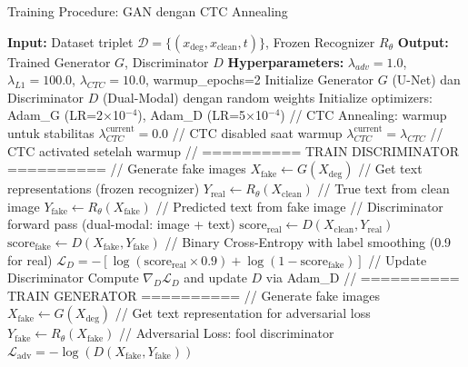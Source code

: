 \documentclass[12pt,a4paper]{article}
\begin{document}
\begin{algorithm}[H]
\caption{Training Procedure: GAN dengan CTC Annealing}
\label{alg:gan-training}
\scriptsize
\begin{algorithmic}[1]
\STATE \textbf{Input:} Dataset triplet $\mathcal{D} = \{(x_{\text{deg}}, x_{\text{clean}}, t)\}$, Frozen Recognizer $R_{\theta}$
\STATE \textbf{Output:} Trained Generator $G$, Discriminator $D$
\STATE \textbf{Hyperparameters:} $\lambda_{adv}=1.0$, $\lambda_{L1}=100.0$, $\lambda_{CTC}=10.0$, warmup\_epochs=2
\STATE
\STATE Initialize Generator $G$ (U-Net) dan Discriminator $D$ (Dual-Modal) dengan random weights
\STATE Initialize optimizers: Adam\_G (LR=2×10$^{-4}$), Adam\_D (LR=5×10$^{-4}$)
\STATE
{}
    \STATE // CTC Annealing: warmup untuk stabilitas
        \STATE $\lambda_{CTC}^{\text{current}} = 0.0$ \quad // CTC disabled saat warmup
    \ELSE
        \STATE $\lambda_{CTC}^{\text{current}} = \lambda_{CTC}$ \quad // CTC activated setelah warmup
    \ENDIF
    \STATE
        \STATE // ========== TRAIN DISCRIMINATOR ==========
        \STATE // Generate fake images
        \STATE $X_{\text{fake}} \gets G(X_{\text{deg}})$
        \STATE
        \STATE // Get text representations (frozen recognizer)
        \STATE $Y_{\text{real}} \gets R_{\theta}(X_{\text{clean}})$ \quad // True text from clean image
        \STATE $Y_{\text{fake}} \gets R_{\theta}(X_{\text{fake}})$ \quad // Predicted text from fake image
        \STATE
        \STATE // Discriminator forward pass (dual-modal: image + text)
        \STATE $\text{score}_{\text{real}} \gets D(X_{\text{clean}}, Y_{\text{real}})$
        \STATE $\text{score}_{\text{fake}} \gets D(X_{\text{fake}}, Y_{\text{fake}})$
        \STATE
        \STATE // Binary Cross-Entropy with label smoothing (0.9 for real)
        \STATE $\mathcal{L}_D = -[\log(\text{score}_{\text{real}} \times 0.9) + \log(1 - \text{score}_{\text{fake}})]$
        \STATE
        \STATE // Update Discriminator
        \STATE Compute $\nabla_D \mathcal{L}_D$ and update $D$ via Adam\_D
        \STATE
        \STATE // ========== TRAIN GENERATOR ==========
        \STATE // Generate fake images
        \STATE $X_{\text{fake}} \gets G(X_{\text{deg}})$
        \STATE
        \STATE // Get text representation for adversarial loss
        \STATE $Y_{\text{fake}} \gets R_{\theta}(X_{\text{fake}})$
        \STATE
        \STATE // Adversarial Loss: fool discriminator
        \STATE $\mathcal{L}_{\text{adv}} = -\log(D(X_{\text{fake}}, Y_{\text{fake}}))$

\end{algorithmic}
\end{algorithm}
\end{document}
